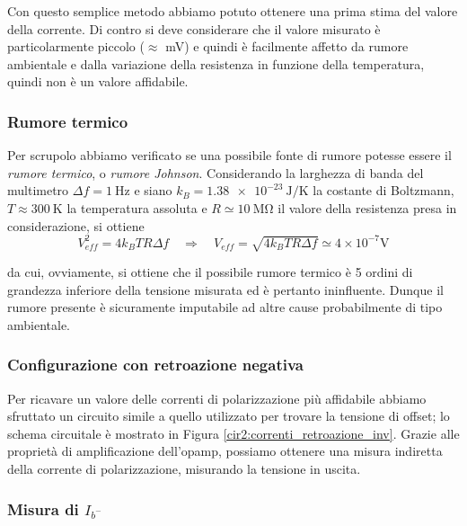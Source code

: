 Con questo semplice metodo abbiamo potuto ottenere una prima stima del valore della corrente.
Di contro si deve considerare che il valore misurato è particolarmente piccolo ($\approx$ \si{\milli\volt}) e quindi è facilmente affetto da rumore ambientale e dalla variazione della resistenza in funzione della temperatura, quindi non è un valore affidabile.

\subsubsection*{Rumore termico}

Per scrupolo abbiamo verificato se una possibile fonte di rumore potesse essere il \textit{rumore termico}, o \textit{rumore Johnson}.
Considerando la larghezza di banda del multimetro $\Delta f = \SI{1}{\hertz}$ e siano $k_B = \SI{1.38e-23}{\joule\per\kelvin}$ la costante di Boltzmann, $T \approx \SI{300}{\kelvin}$ la temperatura assoluta e $R \simeq \SI{10}{\mega\ohm}$ il valore della resistenza presa in considerazione, si ottiene
\begin{equation}
	V_{eff}^2 = 4 k_B T R \Delta f \quad \Rightarrow \quad V_{eff} = \sqrt{4 k_B T R \Delta f} \simeq 4 \times 10^{-7} \si{\volt}
\end{equation}

da cui, ovviamente, si ottiene che il possibile rumore termico è 5 ordini di grandezza inferiore della tensione misurata ed è pertanto ininfluente.
Dunque il rumore presente è sicuramente imputabile ad altre cause probabilmente di tipo ambientale.

\subsubsection{Configurazione con retroazione negativa}

Per ricavare un valore delle correnti di polarizzazione più affidabile abbiamo sfruttato un circuito simile a quello utilizzato per trovare la tensione di offset; lo schema circuitale è mostrato in Figura \ref{cir2:correnti_retroazione_inv}.
Grazie alle proprietà di amplificazione dell'opamp, possiamo ottenere una misura indiretta della corrente di polarizzazione, misurando la tensione in uscita.

\subsubsection*{Misura di $I_{b^-}$}

